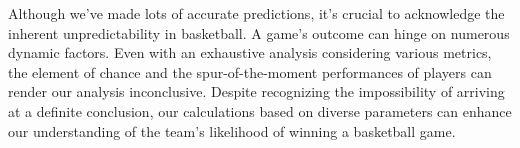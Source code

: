 \documentclass[conference]{IEEEtran}
\begin{document}
Although we've made lots of accurate predictions, it's crucial to acknowledge the inherent unpredictability in basketball. A game's outcome can hinge on numerous dynamic factors. Even with an exhaustive analysis considering various metrics, the element of chance and the spur-of-the-moment performances of players can render our analysis inconclusive. Despite recognizing the impossibility of arriving at a definite conclusion, our calculations based on diverse parameters can enhance our understanding of the team's likelihood of winning a basketball game.
\end{document}
